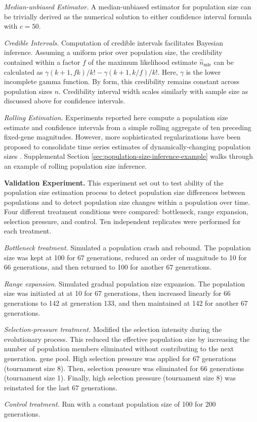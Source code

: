 \textit{Median-unbiased Estimator.}
A median-unbiased estimator for population size can be trivially derived as the numerical solution to either confidence interval formula with $c = 50$.

\textit{Credible Intervals.}
Computation of credible intervals facilitates Bayesian inference.
Assuming a uniform prior over population size,
the credibility contained within a factor $f$ of the maximum likelihood estimate $\hat{n}_\mathrm{mle}$ can be calculated as $\gamma(k + 1, f k)/k! - \gamma(k + 1, k/f)/k!$.
Here, $\gamma$ is the lower incomplete gamma function.
By form, this credibility remains constant across population sizes $n$.
Credibility interval width scales similarly with sample size as discussed above for confidence intervals.

\textit{Rolling Estimation.}
Experiments reported here compute a population size estimate and confidence intervals from a simple rolling aggregate of ten preceding fixed-gene magnitudes.
However, more sophisticated regularizations have been proposed to consolidate time series estimates of dynamically-changing population sizes \citep{hakan2012distributed}.
Supplemental Section \ref{sec:population-size-inference-example} walks through an example of rolling population size inference.

\textbf{Validation Experiment.}
This experiment set out to test ability of the population size estimation process to detect population size differences between populations and to detect population size changes within a population over time.
Four different treatment conditions were compared: bottleneck, range expansion, selection pressure, and control.
Ten independent replicates were performed for each treatment.

\textit{Bottleneck treatment.}
Simulated a population crash and rebound.
The population size was kept at 100 for 67 generations, reduced an order of magnitude to 10 for 66 generations, and then returned to 100 for another 67 generations.

\textit{Range expansion.}
Simulated gradual population size expansion.
The population size was initiated at at 10 for 67 generations, then increased linearly for 66 generations to 142 at generation 133, and then maintained at 142 for another 67 generations.

\textit{Selection-pressure treatment.}
Modified the selection intensity during the evolutionary process.
This reduced the effective population size by increasing the number of population members eliminated without contributing to the next generation. gene pool.
High selection pressure was applied for 67 generations (tournament size 8). Then, selection pressure was eliminated for 66 generations (tournament size 1).
Finally, high selection pressure (tournament size 8) was reinstated for the last 67 generations.

\textit{Control treatment.} Run with a constant population size of 100 for 200 generations.

